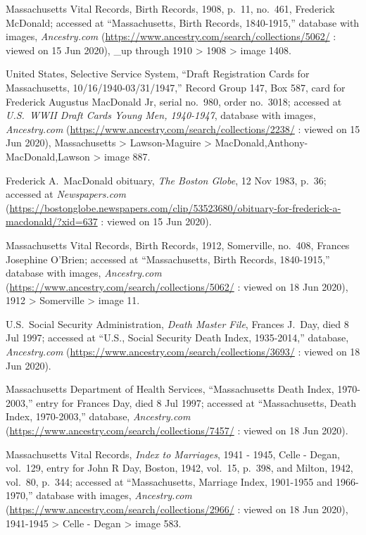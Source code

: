 \begin{thebibliography}{999}
	Massachusetts Vital Records, Birth Records, 1908, p.\ 11, no.\ 461, Frederick McDonald; accessed at ``Massachusetts, Birth Records, 1840-1915,'' database with images, \textit{Ancestry.com} (\url{https://www.ancestry.com/search/collections/5062/} : viewed on 15 Jun 2020), \_up through 1910 > 1908 > image 1408.
	
	United States, Selective Service System, ``Draft Registration Cards for Massachusetts, 10/16/1940-03/31/1947,'' Record Group 147, Box 587, card for Frederick Augustus MacDonald Jr, serial no.\ 980, order no.\ 3018; accessed at \textit{U.S.\ WWII Draft Cards Young Men, 1940-1947}, database with images, \textit{Ancestry.com} (\url{https://www.ancestry.com/search/collections/2238/} : viewed on 15 Jun 2020), Massachusetts > Lawson-Maguire > MacDonald,Anthony-MacDonald,Lawson > image 887.
	
	Frederick A.\ MacDonald obituary, \textit{The Boston Globe}, 12 Nov 1983, p.\ 36; accessed at \textit{Newspapers.com} (\url{https://bostonglobe.newspapers.com/clip/53523680/obituary-for-frederick-a-macdonald/?xid=637} : viewed on 15 Jun 2020).
	
	Massachusetts Vital Records, Birth Records, 1912, Somerville, no.\ 408, Frances Josephine O'Brien; accessed at ``Massachusetts, Birth Records, 1840-1915,'' database with images, \textit{Ancestry.com} (\url{https://www.ancestry.com/search/collections/5062/} : viewed on 18 Jun 2020), 1912 > Somerville > image 11.
	
	U.S.\ Social Security Administration, \textit{Death Master File}, Frances J.\ Day, died 8 Jul 1997; accessed at ``U.S., Social Security Death Index, 1935-2014,'' database, \textit{Ancestry.com} (\url{https://www.ancestry.com/search/collections/3693/} : viewed on 18 Jun 2020).
	
	Massachusetts Department of Health Services, ``Massachusetts Death Index, 1970-2003,'' entry for Frances Day, died 8 Jul 1997; accessed at ``Massachusetts, Death Index, 1970-2003,'' database, \textit{Ancestry.com} (\url{https://www.ancestry.com/search/collections/7457/} : viewed on 18 Jun 2020).
	
	Massachusetts Vital Records, \textit{Index to Marriages}, 1941 - 1945, Celle - Degan, vol.\ 129, entry for John R Day, Boston, 1942, vol.\ 15, p.\ 398, and Milton, 1942, vol.\ 80, p.\ 344; accessed at ``Massachusetts, Marriage Index, 1901-1955 and 1966-1970,'' database with images, \textit{Ancestry.com} (\url{https://www.ancestry.com/search/collections/2966/} : viewed on 18 Jun 2020), 1941-1945 > Celle - Degan > image 583.
	

\end{thebibliography}
